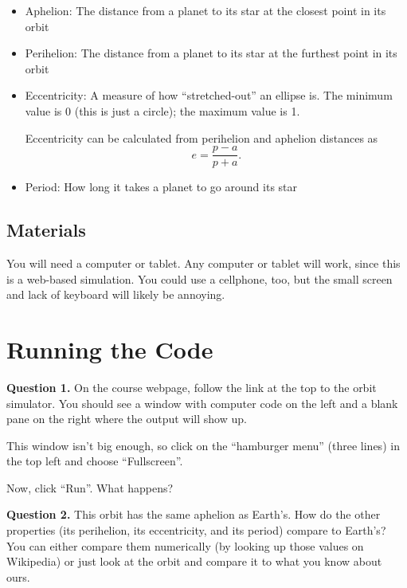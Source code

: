 \documentclass[11pt]{article}
\begin{document}
\begin{itemize}
	\item Aphelion: The distance from a planet to its star at the closest point in its orbit
	\item Perihelion: The distance from a planet to its star at the furthest point in its orbit
	\item Eccentricity: A measure of how ``stretched-out'' an ellipse is. The minimum value is 0 (this is just a circle); the maximum value is 1.
	
	Eccentricity can be calculated from perihelion and aphelion distances as $$e=\frac{p-a}{p+a}.$$
	
	\item Period: How long it takes a planet to go around its star
\end{itemize}

\subsection*{Materials} 

You will need a computer or tablet. Any computer or tablet will work, since this is a web-based simulation. You could use a cellphone, too, but 
the small screen and lack of keyboard will likely be annoying.

\newpage

\section{Running the Code}

\textbf{Question 1.} On the course webpage, follow the link at the top to the orbit simulator. You should see a window with computer code on the left
and a blank pane on the right where the output will show up.

This window isn't big enough, so click on the ``hamburger menu'' (three lines) in the top left and choose ``Fullscreen''.

Now, click ``Run''. What happens?

\vspace*{1.5cm}
\hrulefill

\textbf{Question 2.} This orbit has the same aphelion as Earth's. How do the other properties (its perihelion, its eccentricity, and its period) compare to Earth's? 
You can either compare them numerically (by looking up those values on Wikipedia) or just look at the orbit and compare it to what you know about ours.

\vspace*{2.5cm}
\hrulefill\\
\end{document}
